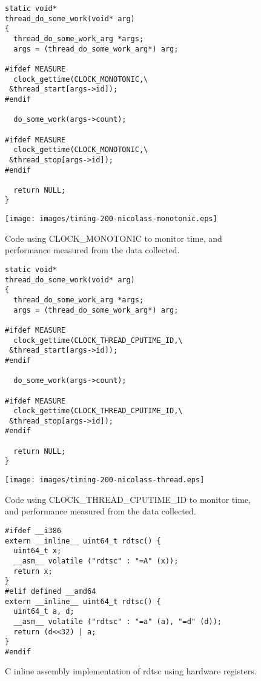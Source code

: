 \begin{figure}
\centering
\begin{lstlisting}
static void*
thread_do_some_work(void* arg)
{
  thread_do_some_work_arg *args;
  args = (thread_do_some_work_arg*) arg;

#ifdef MEASURE
  clock_gettime(CLOCK_MONOTONIC,\
 &thread_start[args->id]);
#endif

  do_some_work(args->count);

#ifdef MEASURE
  clock_gettime(CLOCK_MONOTONIC,\
 &thread_stop[args->id]);
#endif

  return NULL;
}
\end{lstlisting}
\texttt{[image: images/timing-200-nicolass-monotonic.eps]}
\caption{Code using CLOCK\_MONOTONIC to monitor time, and performance measured from the data collected.}
\label{fig:monotonic}
\end{figure}

\begin{figure}
\centering
\begin{lstlisting}
static void*
thread_do_some_work(void* arg)
{
  thread_do_some_work_arg *args;
  args = (thread_do_some_work_arg*) arg;

#ifdef MEASURE
  clock_gettime(CLOCK_THREAD_CPUTIME_ID,\
 &thread_start[args->id]);
#endif

  do_some_work(args->count);

#ifdef MEASURE
  clock_gettime(CLOCK_THREAD_CPUTIME_ID,\
 &thread_stop[args->id]);
#endif

  return NULL;
}
\end{lstlisting}
\texttt{[image: images/timing-200-nicolass-thread.eps]}
\caption{Code using CLOCK\_THREAD\_CPUTIME\_ID to monitor time, and performance measured from the data collected.}
\label{fig:thread}
\end{figure}

\begin{figure}
\centering
\begin{lstlisting}
#ifdef __i386
extern __inline__ uint64_t rdtsc() {
  uint64_t x;
  __asm__ volatile ("rdtsc" : "=A" (x));
  return x;
}
#elif defined __amd64
extern __inline__ uint64_t rdtsc() {
  uint64_t a, d;
  __asm__ volatile ("rdtsc" : "=a" (a), "=d" (d));
  return (d<<32) | a;
}
#endif
\end{lstlisting}
\caption{C inline assembly implementation of rdtsc using hardware registers.}
\label{fig:rdtsc}
\end{figure}

